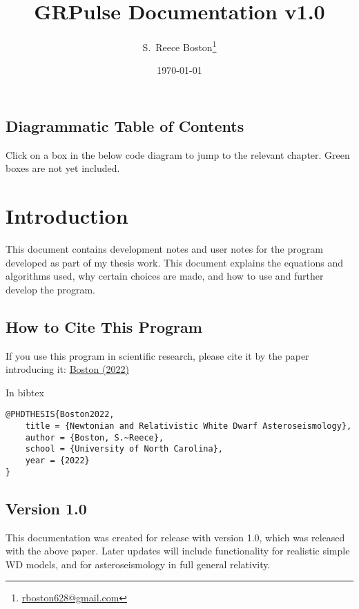 \documentclass[notitlepage]{report}
\makeatletter
\newcommand{\mypaper}{\href{}{Boston (2022)}}
\def\myemail{rboston628@gmail.com}
\def\version{1.0}
\newcommand{\tcode}[1]{\text{\tt#1}}
\makeatother
\begin{document}
\title{GRPulse Documentation v\version}
\date{\today}

\author{S.~Reece Boston\footnote{\href{mailto:\myemail}{\myemail}}}
\maketitle

\section*{Diagrammatic Table of Contents}
Click on a box in the below code diagram to jump to the relevant chapter.  Green boxes are not yet included.
\begin{center}

\end{center}


\tableofcontents


\chapter{Introduction}
This document contains development notes and user notes for the \tcode{GRPulse} program developed as part of my thesis work.  This document explains the equations and algorithms used, why certain choices are made, and how to use and further develop the program.

\section{How to Cite This Program}
If you use this program in scientific research, please cite it by the paper introducing it: \mypaper

In bibtex
\begin{verbatim}
@PHDTHESIS{Boston2022,
	title = {Newtonian and Relativistic White Dwarf Asteroseismology},
	author = {Boston, S.~Reece},
	school = {University of North Carolina},
	year = {2022}
}
\end{verbatim}



\section{Version \version}
This documentation was created for release with version \version, which was released with the above paper.  Later updates will include functionality for realistic simple WD models, and for asteroseismology in full general relativity.
\end{document}
